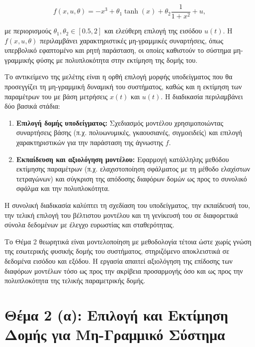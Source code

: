 \documentclass[a4paper,12pt]{report}
\begin{document}
\[
f(x, u, \theta) = -x^3 + \theta_1 \tanh(x) + \theta_2 \frac{1}{1 + x^2} + u,
\]

\hspace{-0.6cm}με περιορισμούς $\theta_1, \theta_2 \in [0.5, 2]$ και ελεύθερη επιλογή της εισόδου $u(t)$. Η $f(x,u,\theta)$ περιλαμβάνει χαρακτηριστικές μη-γραμμικές συναρτήσεις, όπως υπερβολικό εφαπτομένο και ρητή παράσταση, οι οποίες καθιστούν το σύστημα μη-γραμμικής φύσης με πολυπλοκότητα στην εκτίμηση της δομής του.

\hspace{-0.6cm}Το αντικείμενο της μελέτης είναι η ορθή επιλογή μορφής υποδείγματος που θα προσεγγίζει τη μη-γραμμική δυναμική του συστήματος, καθώς και η εκτίμηση των παραμέτρων του με βάση μετρήσεις $x(t)$ και $u(t)$. Η διαδικασία περιλαμβάνει δύο βασικά στάδια:

\begin{enumerate}
    \item \textbf{Επιλογή δομής υποδείγματος:} Σχεδιασμός μοντέλου χρησιμοποιώντας συναρτήσεις βάσης (π.χ. πολυωνυμικές, γκαουσιανές, σιγμοειδείς) και επιλογή χαρακτηριστικών για την παράσταση της άγνωστης $f$.
    
    \item \textbf{Εκπαίδευση και αξιολόγηση μοντέλου:} Εφαρμογή κατάλληλης μεθόδου εκτίμησης παραμέτρων (π.χ. ελαχιστοποίηση σφάλματος με τη μέθοδο ελαχίστων τετραγώνων) και σύγκριση της απόδοσης διαφόρων δομών ως προς το συνολικό σφάλμα και την πολυπλοκότητα.
\end{enumerate}

\hspace{-0.6cm}Η συνολική διαδικασία καλύπτει τη σχεδίαση του υποδείγματος, την εκπαίδευσή του, την τελική επιλογή του βέλτιστου μοντέλου και τη γενίκευσή του σε διαφορετικά σύνολα δεδομένων με έλεγχο ευρωστίας και σταθερότητας.

\vspace{0.2cm}

\hspace{-0.6cm}Το Θέμα 2 θεωρητικά είναι μοντελοποίηση με μεθοδολογία τέτοια ώστε χωρίς γνώση της εσωτερικής φυσικής δομής του συστήματος, στηριζόμενο αποκλειστικά σε δεδομένα εισόδου και εξόδου. Η εργασία απαιτεί αξιολόγηση της επίδοσης των διαφόρων μοντέλων τόσο ως προς την ακρίβεια προσαρμογής όσο και ως προς την πολυπλοκότητα της τελικής παραμετρικής δομής.

\vspace{0.3cm}

\section{Θέμα 2 (α): Επιλογή και Εκτίμηση Δομής για Μη-Γραμμικό Σύστημα}
\end{document}
